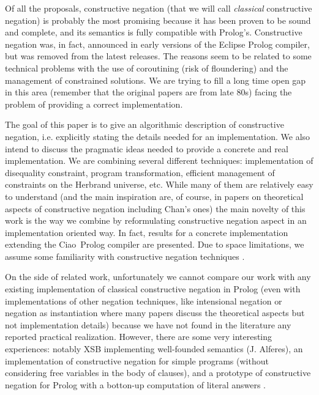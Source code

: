 \documentclass{llncs}
\newcommand{\ciao}{Ciao}
\begin{document}
Of all the proposals, constructive negation \cite{Chan1,Chan2} (that
we will call \emph{classical} constructive negation) is probably the
most promising because it has been proven to be sound and complete,
and its semantics is fully compatible with Prolog's. Constructive
negation was, in fact, announced in early versions of the Eclipse
Prolog compiler, but was removed from the latest releases.  The
reasons seem to be related to some technical problems with the use of
coroutining (risk of floundering) and the management of constrained
solutions. We are trying to fill a long time open gap in this area
(remember that the original papers are from late 80s) facing the
problem of providing a correct implementation.

The goal of this paper is to give an algorithmic description of
constructive negation, i.e. explicitly stating the details needed for
an implementation. We also intend to discuss the pragmatic ideas
needed to provide a concrete and real implementation.  We are
combining several different techniques: implementation of disequality
constraint, program transformation, efficient management of
constraints on the Herbrand universe, etc. While many of them are
relatively easy to understand (and the main inspiration are, of
course, in papers on theoretical aspects of constructive negation
including Chan's ones) the main novelty of this work is the way we
combine by reformulating constructive negation aspect in an
implementation oriented way.  In fact, results for a concrete
implementation extending the \ciao\ Prolog compiler are presented.
Due to space limitations, we assume some familiarity with constructive
negation techniques \cite{Chan1,Chan2}.

On the side of related work, unfortunately we cannot compare our work
with any existing implementation of classical constructive negation in
Prolog (even with implementations of other negation techniques, like
intensional negation \cite{Barbuti1,Bruscoli} or negation as
instantiation \cite{DiPierro} where many papers discuss the
theoretical aspects but not implementation details) because we have
not found in the literature any reported practical
realization. However, there are some very interesting experiences:
notably XSB implementing well-founded semantics (J. Alferes), an
implementation of constructive negation for simple
programs\cite{Bartak} (without considering free variables in the body
of clauses), and a prototype of constructive negation for Prolog with
a botton-up computation of literal answers \cite{BNC-cneg}.
\end{document}
